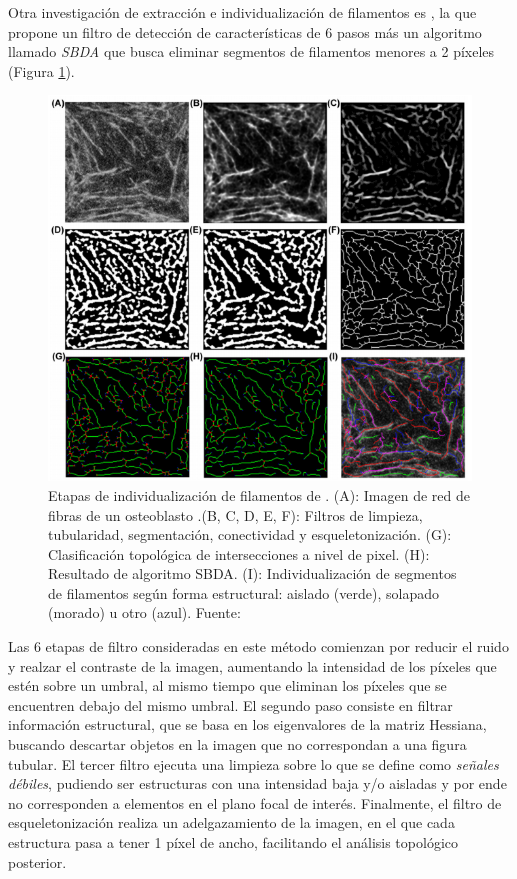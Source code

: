 Otra investigaci\'on de extracci\'on e individualizaci\'on de filamentos es \cite{qiu2014quantitative}, la que propone un filtro de detecci\'on de caracter\'isticas de 6 pasos m\'as un algoritmo llamado \textit{SBDA} que busca eliminar segmentos de filamentos menores a 2 p\'ixeles (Figura \ref{fig:IFS}). 
\begin{figure}[H]
        \centering
        \includegraphics[scale=0.75]{imagenes/QuantitativeIFS.png}
        \caption{Etapas de individualizaci\'on de filamentos de \cite{qiu2014quantitative}. (A): Imagen de red de fibras de un osteoblasto .(B, C, D, E, F): Filtros de limpieza, tubularidad, segmentaci\'on, conectividad y esqueletonizaci\'on. (G): Clasificaci\'on topol\'ogica de intersecciones a nivel de pixel. (H): Resultado de algoritmo SBDA. (I): Individualizaci\'on de segmentos de filamentos seg\'un forma estructural: aislado (verde), solapado (morado) u otro (azul). Fuente: \cite{qiu2014quantitative}}
        \label{fig:IFS}
\end{figure}

Las 6 etapas de filtro consideradas en este m\'etodo comienzan por reducir el ruido y realzar el contraste de la imagen, aumentando la intensidad de los p\'ixeles que est\'en sobre un umbral, al mismo tiempo que eliminan los p\'ixeles que se encuentren debajo del mismo umbral. El segundo paso consiste en filtrar informaci\'on estructural, que se basa en los eigenvalores de la matriz Hessiana, buscando descartar objetos en la imagen que no correspondan a una figura tubular. El tercer filtro ejecuta una limpieza sobre lo que se define como \textit{se\~nales d\'ebiles}, pudiendo ser estructuras con una intensidad baja y/o aisladas y por ende no corresponden a elementos en el plano focal de inter\'es. Finalmente, el filtro de esqueletonizaci\'on realiza un adelgazamiento de la imagen, en el que cada estructura pasa a tener 1 p\'ixel de ancho, facilitando el an\'alisis topol\'ogico posterior. \\

